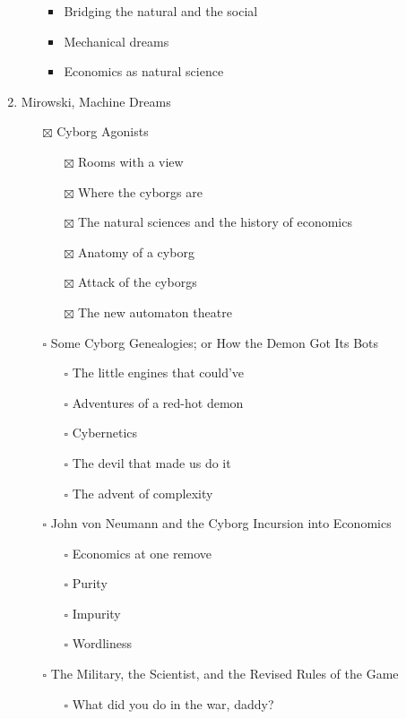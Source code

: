 \documentclass[paper=B6,portrait,twoside=true,twocolumn=false,headinclude=true,footinclude=false,fontsize=12,BCOR=10mm,DIV=calc,pagesize=auto,titlepage=firstiscover,mpinclude=false,headings=normal,headings=twolinechapter,open=right,toc=graduated,chapterprefix=false,numbers=endperiod,parskip=half+]{scrbook}
\theoremstyle{definition}
\begin{document}
\begin{enumerate}
\begin{itemize}
\begin{itemize}
\item Bridging the natural and the social
\item Mechanical dreams
\item Economics as natural science
\end{itemize}
\end{itemize}
\item\relax [1/8] Mirowski, Machine Dreams
\begin{itemize}
\item[{$\boxtimes$}] Cyborg Agonists
\begin{itemize}
\item[{$\boxtimes$}] Rooms with a view
\item[{$\boxtimes$}] Where the cyborgs are
\item[{$\boxtimes$}] The natural sciences and the history of economics
\item[{$\boxtimes$}] Anatomy of a cyborg
\item[{$\boxtimes$}] Attack of the cyborgs
\item[{$\boxtimes$}] The new automaton theatre
\end{itemize}
\item[{$\square$}] Some Cyborg Genealogies; or How the Demon Got Its Bots
\begin{itemize}
\item[{$\square$}] The little engines that could've
\item[{$\square$}] Adventures of a red-hot demon
\item[{$\square$}] Cybernetics
\item[{$\square$}] The devil that made us do it
\item[{$\square$}] The advent of complexity
\end{itemize}
\item[{$\square$}] John von Neumann and the Cyborg Incursion into Economics
\begin{itemize}
\item[{$\square$}] Economics at one remove
\item[{$\square$}] Purity
\item[{$\square$}] Impurity
\item[{$\square$}] Wordliness
\end{itemize}
\item[{$\square$}] The Military, the Scientist, and the Revised Rules of the Game
\begin{itemize}
\item[{$\square$}] What did you do in the war, daddy?

\end{itemize}
\end{itemize}
\end{enumerate}
\end{document}
